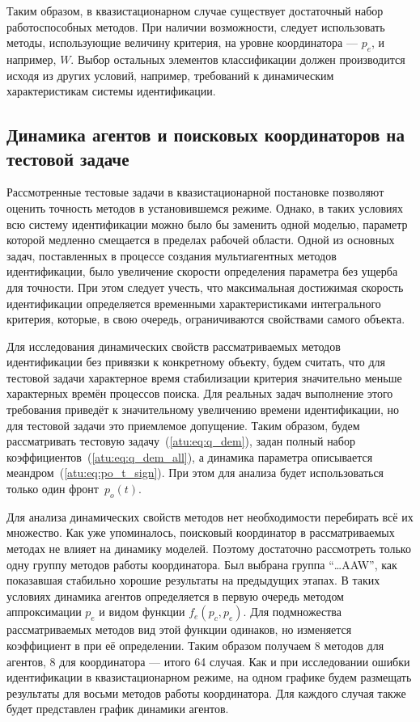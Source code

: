Таким образом, в квазистационарном случае существует достаточный набор работоспособных методов.
При наличии возможности, следует использовать методы,
использующие величину критерия, на уровне координатора --- $p_e$, и например, $W$.
Выбор остальных элементов классификации должен производится исходя из
других условий, например, требований к динамическим характеристикам системы идентификации.



\subsection{Динамика агентов и поисковых координаторов на тестовой задаче}  %

Рассмотренные тестовые задачи в квазистационарной постановке позволяют оценить
точность методов в установившемся режиме. Однако, в таких условиях
всю систему идентификации можно было бы заменить одной моделью,
параметр которой медленно смещается в пределах рабочей области.
Одной из основных задач, поставленных в процессе создания мультиагентных методов идентификации,
было увеличение скорости определения параметра без ущерба для точности.
При этом следует учесть, что максимальная достижимая скорость идентификации
определяется временными характеристиками интегрального критерия,
которые, в свою очередь, ограничиваются свойствами самого объекта.

Для исследования динамических свойств рассматриваемых методов идентификации
без привязки к конкретному объекту, будем считать,
что для тестовой задачи характерное время стабилизации критерия
значительно меньше характерных времён процессов поиска.
Для реальных задач выполнение этого требования приведёт
к значительному увеличению времени идентификации,
но для тестовой задачи это приемлемое допущение.
Таким образом, будем рассматривать тестовую задачу~(\ref{atu:eq:q_dem}),
задан полный набор коэффициентов~(\ref{atu:eq:q_dem_all}),
а динамика параметра описывается меандром~(\ref{atu:eq:po_t_sign}).
При этом для анализа будет использоваться только
один фронт~$p_o(t)$.

Для анализа динамических свойств методов нет необходимости перебирать всё их множество.
Как уже упоминалось, поисковый координатор в рассматриваемых методах
не влияет на динамику моделей. Поэтому достаточно рассмотреть
только одну группу методов работы координатора. Был выбрана группа ``\ldots{}AAW'',
как показавшая стабильно хорошие результаты на предыдущих этапах.
В таких условиях динамика агентов определяется в первую очередь
методом аппроксимации $p_e$ и видом функции $f_e(p_c,p_e)$.
Для подмножества рассматриваемых методов вид этой функции одинаков,
но изменяется коэффициент в при её определении.
Таким образом получаем 8 методов для агентов, 8 для координатора --- итого 64 случая.
Как и при исследовании ошибки идентификации в квазистационарном режиме,
на одном графике будем размещать результаты для восьми методов работы координатора.
Для каждого случая также будет представлен график динамики агентов.

